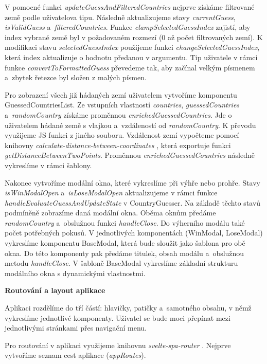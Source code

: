 V pomocné funkci \emph{updateGuessAndFilteredCountries} nejprve získáme filtrované země podle uživatelova tipu. Následně aktualizujeme stavy \emph{currentGuess}, \emph{isValidGuess} a~\emph{filteredCountries}. 
Funkce \emph{clampSelectedGuessIndex} zajistí, aby index vybrané země byl v požadovaném rozmezí (0 až počet filtrovaných zemí). 
K modifikaci stavu \emph{selectedGuessIndex} použijeme funkci \emph{changeSelectedGuessIndex}, která index aktualizuje o hodnotu předanou v argumentu. 
Tip uživatele v rámci funkce \emph{convertToFormattedGuess} převedeme tak, aby začínal velkým písmenem a~zbytek řetezce byl složen z malých písmen.

Pro zobrazení všech již hádaných zemí uživatelem vytvoříme komponentu GuessedCountriesList. 
Ze vstupních vlastností \emph{countries}, \emph{guessedCountries} a~\emph{randomCountry} získáme proměnnou \emph{enrichedGuessedCountries}. 
Jde o uživatelem hádané země s vlajkou a~vzdáleností od \emph{randomCountry}. K převodu využijeme JS funkci z jiného souboru. 
Vzdálenost zemí vypočteme pomocí knihovny \emph{calculate-distance-between-coordinates} \cite{distancebetweencoordinates}, která exportuje funkci \emph{getDistanceBetweenTwoPoints}. 
Proměnnou \emph{enrichedGuessedCountries} následně vykreslíme v rámci šablony.

Nakonec vytvoříme modální okna, které vykreslíme při výhře nebo prohře. Stavy \emph{isWinModalOpen} a~\emph{isLoseModalOpen} aktualizujeme v rámci funkce \emph{handleEvaluateGuessAndUpdateState} v CountryGuesser. 
Na základě těchto stavů podmíněně zobrazíme daná modální okna. Oběma oknům předáme \emph{randomCountry} a~obslužnou funkci \emph{handleClose}. Do výherního modálu také počet potřebných pokusů. 
V jednotlivých komponentách (WinModal, LoseModal) vykreslíme komponentu BaseModal, která bude sloužit jako šablona pro obě okna. Do této komponenty pak předáme titulek, obsah modálu a~obslužnou metodu \emph{handleClose}. 
V šabloně BaseModal vykreslíme základní strukturu modálního okna s dynamickými vlastnostmi.

\begin{flushleft}
  \textbf{Routování a layout aplikace}
\end{flushleft}

Aplikaci rozdělíme do tří částí: hlavičky, patičky a~samotného obsahu, v němž vykreslíme jednotlivé komponenty. Uživatel se bude moci přepínat mezi jednotlivými stránkami přes navigační menu. 

Pro routování v aplikaci využijeme knihovnu \emph{svelte-spa-router} \cite{sveltesparouterlib}. Nejprve vytvoříme seznam cest aplikace (\emph{appRoutes}).

